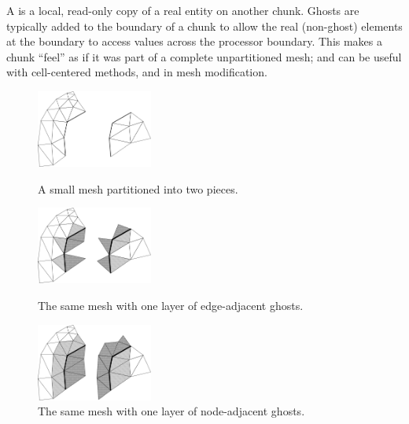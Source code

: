 A  is a local, read-only copy of a real entity
on another chunk. Ghosts are typically added to the boundary of a chunk to allow the real (non-ghost) elements at the boundary to access values across the processor boundary.  This makes a chunk ``feel'' as if it was part of a complete unpartitioned mesh; and can be useful with cell-centered methods, and in mesh modification.

\begin{figure}
\begin{center}
\includegraphics[width=1.5in]{fig/ghost_pre}
\end{center}
\caption{A small mesh partitioned into two pieces.}
\label{fig:ghostpre}


\begin{center}
\includegraphics[width=1.5in]{fig/ghost_edge}
\end{center}
\caption{The same mesh with one layer of edge-adjacent ghosts.}
\label{fig:ghostedge}


\begin{center}
\includegraphics[width=1.5in]{fig/ghost_node}
\end{center}
\caption{The same mesh with one layer of node-adjacent ghosts.}
\label{fig:ghostnode}
\end{figure}


